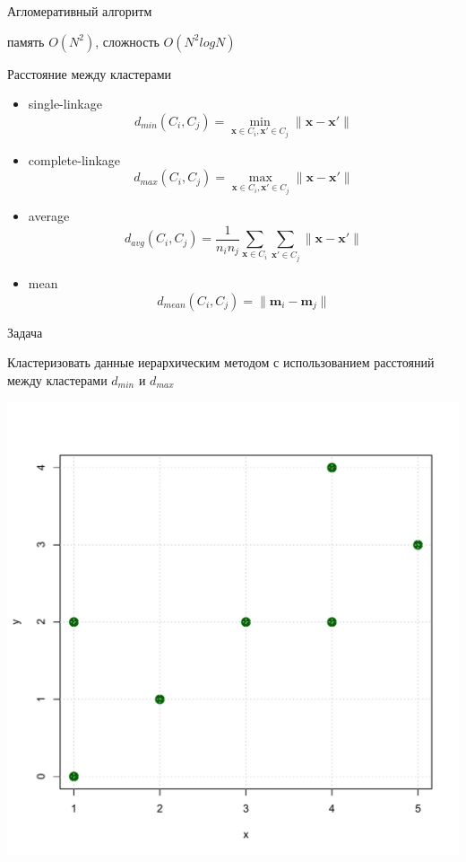 \documentclass[10pt]{beamer}
\begin{document}
\begin{frame}{Агломеративный алгоритм}

\hier
память $O(N^2)$, сложность $O(N^2 log N)$

\end{frame}

\begin{frame}{Расстояние между кластерами}

\begin{itemize}
\item single-linkage
\[
d_{min}(C_i, C_j) = \min_{\mathbf{x} \in C_i, \mathbf{x}' \in C_j} \|\mathbf{x} -\mathbf{x}' \|
\]
\item complete-linkage
\[
d_{max}(C_i, C_j) = \max_{\mathbf{x} \in C_i, \mathbf{x}' \in C_j} \|\mathbf{x} -\mathbf{x}' \|
\]
\item average
\[
d_{avg}(C_i, C_j) = \frac{1}{n_i n_j}\sum_{\mathbf{x} \in C_i}\sum_{\mathbf{x}' \in C_j} \|\mathbf{x} -\mathbf{x}' \|
\]
\item mean
\[
d_{mean}(C_i, C_j) = \|\mathbf{m}_i -\mathbf{m}_j \|
\]
\end{itemize}

\end{frame}

\begin{frame}{Задача}

Кластеризовать данные иерархическим методом с использованием расстояний между кластерами $d_{min}$ и $d_{max}$
\begin{center}
\includegraphics[scale=0.4]{images/problem.pdf}
\end{center}

\end{frame}
\end{document}
